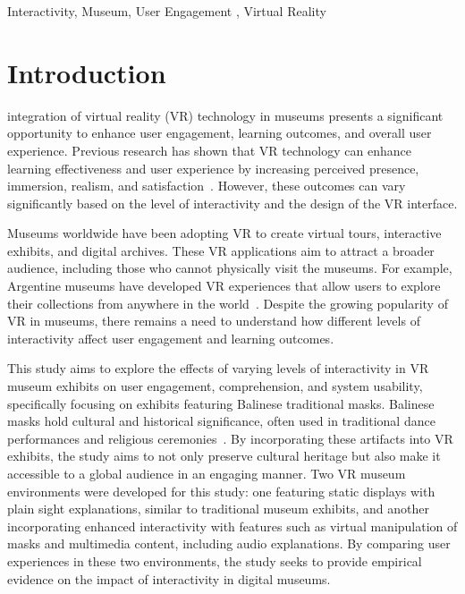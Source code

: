 \documentclass[conference]{IEEEtran}
\begin{document}
\begin{IEEEkeywords}
Interactivity, Museum, User Engagement , Virtual Reality 
\end{IEEEkeywords}

\section{Introduction}
 integration of virtual reality (VR) technology in museums presents a significant opportunity to enhance user engagement, learning outcomes, and overall user experience. Previous research has shown that VR technology can enhance learning effectiveness and user experience by increasing perceived presence, immersion, realism, and satisfaction~\cite{10314973}​. However, these outcomes can vary significantly based on the level of interactivity and the design of the VR interface.

Museums worldwide have been adopting VR to create virtual tours, interactive exhibits, and digital archives. These VR applications aim to attract a broader audience, including those who cannot physically visit the museums. For example, Argentine museums have developed VR experiences that allow users to explore their collections from anywhere in the world~\cite{carvajal2020virtual}. Despite the growing popularity of VR in museums, there remains a need to understand how different levels of interactivity affect user engagement and learning outcomes.

This study aims to explore the effects of varying levels of interactivity in VR museum exhibits on user engagement, comprehension, and system usability, specifically focusing on exhibits featuring Balinese traditional masks. Balinese masks hold cultural and historical significance, often used in traditional dance performances and religious ceremonies~\cite{dadhich2016overview}. By incorporating these artifacts into VR exhibits, the study aims to not only preserve cultural heritage but also make it accessible to a global audience in an engaging manner. Two VR museum environments were developed for this study: one featuring static displays with plain sight explanations, similar to traditional museum exhibits, and another incorporating enhanced interactivity with features such as virtual manipulation of masks and multimedia content, including audio explanations. By comparing user experiences in these two environments, the study seeks to provide empirical evidence on the impact of interactivity in digital museums.
\end{document}
